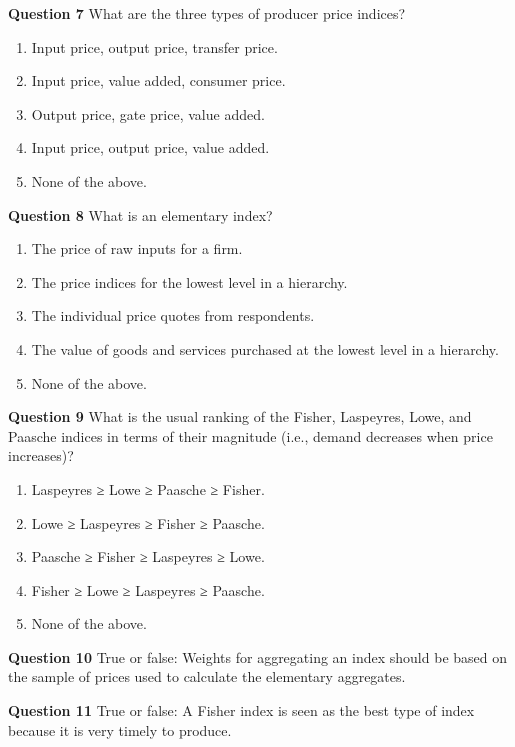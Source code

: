 \documentclass[]{article}
\begin{document}
\textbf{Question 7} What are the three types of producer price indices?

\begin{enumerate}
\def\labelenumi{\alph{enumi})}
\item
  Input price, output price, transfer price.
\item
  Input price, value added, consumer price.
\item
  Output price, gate price, value added.
\item
  Input price, output price, value added.
\item
  None of the above.
\end{enumerate}

\textbf{Question 8} What is an elementary index?

\begin{enumerate}
\def\labelenumi{\alph{enumi})}
\item
  The price of raw inputs for a firm.
\item
  The price indices for the lowest level in a hierarchy.
\item
  The individual price quotes from respondents.
\item
  The value of goods and services purchased at the lowest level in a hierarchy.
\item
  None of the above.
\end{enumerate}

\textbf{Question 9} What is the usual ranking of the Fisher, Laspeyres, Lowe, and Paasche indices in terms of their magnitude (i.e., demand decreases when price increases)?

\begin{enumerate}
\def\labelenumi{\alph{enumi})}
\item
  Laspeyres ≥ Lowe ≥ Paasche ≥ Fisher.
\item
  Lowe ≥ Laspeyres ≥ Fisher ≥ Paasche.
\item
  Paasche ≥ Fisher ≥ Laspeyres ≥ Lowe.
\item
  Fisher ≥ Lowe ≥ Laspeyres ≥ Paasche.
\item
  None of the above.
\end{enumerate}

\textbf{Question 10} True or false: Weights for aggregating an index should be based on the sample of prices used to calculate the elementary aggregates.

\textbf{Question 11} True or false: A Fisher index is seen as the best type of index because it is very timely to produce.
\end{document}
